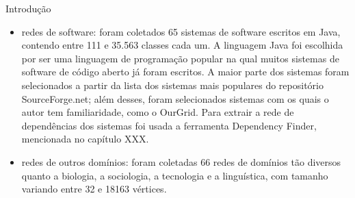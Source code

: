 \begin{section}{Introdução}
\begin{itemize}
	\item redes de software: foram coletados 65 sistemas de software escritos em Java, contendo entre 111 e 35.563 classes cada um. A linguagem Java foi escolhida por ser uma linguagem de programação popular na qual muitos sistemas de software de código aberto já foram escritos. A maior parte dos sistemas foram selecionados a partir da lista dos sistemas mais populares do repositório SourceForge.net; além desses, foram selecionados sistemas com os quais o autor tem familiaridade, como o OurGrid. Para extrair a rede de dependências dos sistemas foi usada a ferramenta Dependency Finder, mencionada no capítulo XXX.
	\item redes de outros domínios: foram coletadas 66 redes de domínios tão diversos quanto a biologia, a sociologia, a tecnologia e a linguística, com tamanho variando entre 32 e 18163 vértices.
\end{itemize}

\end{section}

